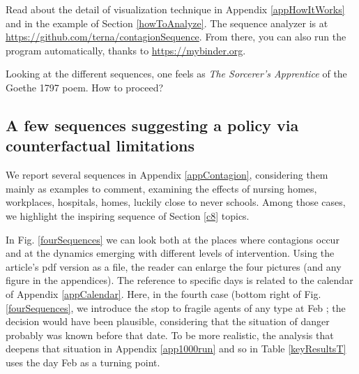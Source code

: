 \documentclass[11pt]{article}
\begin{document}
Read about the detail of visualization technique in Appendix \ref{appHowItWorks} and in the example of Section \ref{howToAnalyze}. The sequence analyzer is at \url{https://github.com/terna/contagionSequence}. From there, you can also run the program automatically, thanks to \url{https://mybinder.org}.

Looking at the different sequences, one feels as \emph{The Sorcerer's Apprentice} of the Goethe 1797 poem. How to proceed?


\subsection{A few sequences suggesting a policy via counterfactual limitations}
\label{seqSuggPol}

We report several sequences in Appendix \ref{appContagion}, considering them mainly as examples to comment, examining the effects of nursing homes, workplaces, hospitals, homes, luckily close to never schools. Among those cases, we highlight the inspiring sequence of Section \ref{c8} topics.

In Fig. \ref{fourSequences} we can look both at the places where contagions occur and at the dynamics emerging with different levels of intervention. Using the article's pdf version as a file, the reader can enlarge the four pictures (and any figure in the appendices). The reference to specific days is related to the calendar of Appendix \ref{appCalendar}. Here, in the fourth case (bottom right of Fig. \ref{fourSequences}, we introduce the stop to fragile agents of any type at Feb ; the decision would have been plausible, considering that the situation of danger probably was known before that date. To be more realistic, the analysis that deepens that situation in Appendix \ref{app1000run} and so in Table \ref{keyResultsT} uses the day Feb  as a turning point.
\end{document}
